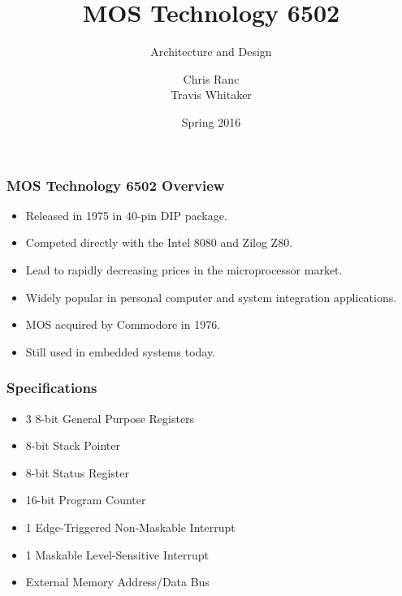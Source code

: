 \documentclass{beamer}
\begin{document}
\title{MOS Technology 6502}
\subtitle{Architecture and Design}
\author{Chris Ranc \\ Travis Whitaker}
\date{Spring 2016}
\maketitle

\begin{frame}
\frametitle{MOS Technology 6502 Overview}
\begin{itemize}
\item Released in 1975 in 40-pin DIP package.
\item Competed directly with the Intel 8080 and Zilog Z80.
\item Lead to rapidly decreasing prices in the microprocessor market.
\item Widely popular in personal computer and system integration applications.
\item MOS acquired by Commodore in 1976.
\item Still used in embedded systems today.
\end{itemize}
\end{frame}

\begin{frame}
\frametitle{Specifications}
\begin{itemize}
\item 3 8-bit General Purpose Registers
\item 8-bit Stack Pointer
\item 8-bit Status Register
\item 16-bit Program Counter
\item 1 Edge-Triggered Non-Maskable Interrupt
\item 1 Maskable Level-Sensitive Interrupt
\item External Memory Address/Data Bus
\end{itemize}
\end{frame}
\end{document}
